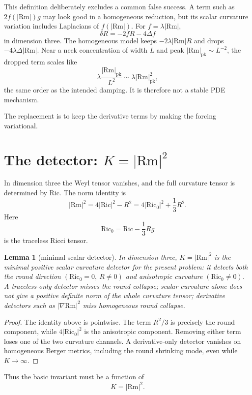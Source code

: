 \documentclass[11pt]{amsart}
\newtheorem{lemma}{Lemma}
\newcommand{\Rm}{\mathrm{Rm}}
\newcommand{\Ric}{\mathrm{Ric}}
\begin{document}
This definition deliberately excludes a common false success.  A term such as
\(2f(|\Rm|)g\) may look good in a homogeneous reduction, but its scalar
curvature variation includes Laplacians of \(f(|\Rm|)\).  For
\(f=\lambda |\Rm|\),
\[
        \delta R=-2fR-4\Delta f
\]
in dimension three.  The homogeneous model keeps \(-2\lambda |\Rm|R\) and
drops \(-4\lambda\Delta |\Rm|\).  Near a neck concentration of width \(L\) and
peak \(|\Rm|_{\mathrm{pk}}\sim L^{-2}\), the dropped term scales like
\[
        \lambda \frac{|\Rm|_{\mathrm{pk}}}{L^2}
        \sim
        \lambda |\Rm|_{\mathrm{pk}}^2,
\]
the same order as the intended damping.  It is therefore not a stable PDE
mechanism.

The replacement is to keep the derivative terms by making the forcing
variational.

\section{The detector: \texorpdfstring{\(K=|\Rm|^2\)}{K=|Rm|2}}

In dimension three the Weyl tensor vanishes, and the full curvature tensor is
determined by \(\Ric\).  The norm identity is
\[
        |\Rm|^2
        =
        4|\Ric|^2-R^2
        =
        4|\Ric_0|^2+\frac13R^2 .
\]
Here
\[
        \Ric_0=\Ric-\frac13Rg
\]
is the traceless Ricci tensor.

\begin{lemma}[minimal scalar detector]
In dimension three, \(K=|\Rm|^2\) is the minimal positive scalar curvature
detector for the present problem: it detects both the round direction
\((\Ric_0=0,\ R\ne0)\) and anisotropic curvature
\((\Ric_0\ne0)\).  A traceless-only detector misses the round collapse; scalar
curvature alone does not give a positive definite norm of the whole curvature
tensor; derivative detectors such as \(|\nabla\Rm|^2\) miss homogeneous
round collapse.
\end{lemma}

\begin{proof}
The identity above is pointwise.  The term \(R^2/3\) is precisely the round
component, while \(4|\Ric_0|^2\) is the anisotropic component.  Removing either
term loses one of the two curvature channels.  A derivative-only detector
vanishes on homogeneous Berger metrics, including the round shrinking mode,
even while \(K\to\infty\).
\end{proof}

Thus the basic invariant must be a function of
\[
        K=|\Rm|^2.
\]
\end{document}
